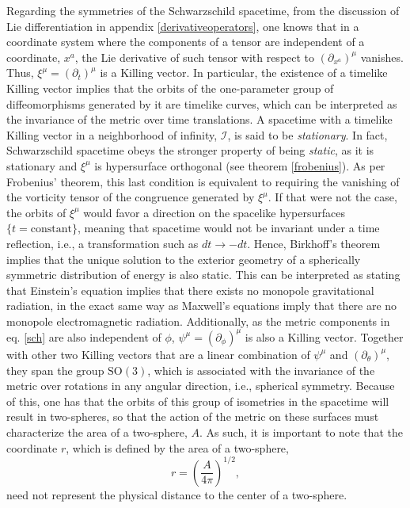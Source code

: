 \documentclass[
12pt,		%
openright,	%
twoside,  %
a4paper,			%
chapter=TITLE,		%
english,			%
french,				%
spanish,			%
brazil				%
]{USPSC-classe/USPSC}
\begin{document}
Regarding the symmetries of the Schwarzschild spacetime, from the discussion of Lie differentiation in appendix \ref{derivativeoperators}, one knows that in a coordinate system where the components of a tensor are independent of a coordinate, $x^a$, the Lie derivative of such tensor with respect to $(\partial_{x^a})^{\mu}$ vanishes. Thus, $\xi^{\mu}=(\partial_{t})^{\mu}$ is a Killing vector. In particular, the existence of a timelike Killing vector implies that the orbits of the one-parameter group of diffeomorphisms generated by it are timelike curves, which can be interpreted as the invariance of the metric over time translations. A spacetime with a timelike Killing vector in a neighborhood of infinity, $\mathscr{I}$, is said to be \textit{stationary}. In fact, Schwarzschild spacetime obeys the stronger property of being \textit{static}, as it is stationary and $\xi^{\mu}$ is hypersurface orthogonal (see theorem \ref{frobenius}). As per Frobenius' theorem, this last condition is equivalent to requiring the vanishing of the vorticity tensor of the congruence generated by $\xi^{\mu}$. If that were not the case, the orbits of $\xi^{\mu}$ would favor a direction on the spacelike hypersurfaces $\{t=\text{constant}\}$, meaning that spacetime would not be invariant under a time reflection, i.e., a transformation such as $dt\to-dt$. Hence, Birkhoff's theorem implies that the unique solution to the exterior geometry of a spherically symmetric distribution of energy is also static. This can be interpreted as stating that Einstein's equation implies that there exists no monopole gravitational radiation, in the exact same way as Maxwell's equations imply that there are no monopole electromagnetic radiation. Additionally, as the metric components in eq. \ref{sch} are also independent of $\phi$,  $\psi^{\mu}=(\partial_{\phi})^{\mu}$ is also a Killing vector. Together with other two Killing vectors that are a linear combination of $\psi^{\mu}$ and $(\partial_{\theta})^{\mu}$, they span the group $\text{SO}(3)$, which is associated with the invariance of the metric over rotations in any angular direction, i.e., spherical symmetry. Because of this, one has that the orbits of this group of isometries in the spacetime will result in two-spheres, so that the action of the metric on these surfaces must characterize the area of a two-sphere, $A$. As such, it is important to note that the coordinate $r$, which is defined by the area of a two-sphere,
\begin{equation}\label{a32}
    r=\left(\frac{A}{4\pi}\right)^{1/2},
\end{equation}
need not represent the physical distance to the center of a two-sphere.
\end{document}
